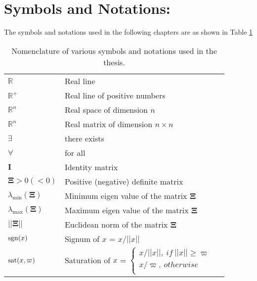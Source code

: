 \section{Symbols and Notations:}
The symbols and notations used in the following chapters are as shown in Table \ref{tab:notations}
\begin{table}[ht!]
    \centering
    \begin{tabular}{l l l}
        $\mathbb{R}$ & Real line  \\
        $\mathbb{R}^+$ & Real line of positive numbers \\
        $\mathbb{R}^n$ & Real space of dimension $n$ \\
        $\mathbb{R}^n$ & Real matrix of dimension $n \times n$ \\
        $\exists$ & there exists \\
        $\forall$ & for all \\
        $\mathbf{I}$ & Identity matrix \\ 
        $\mathbf{\Xi} > 0 (<0)$ & Positive (negative) definite matrix \\
        $\lambda_{\min}(\mathbf{\Xi})$  & Minimum eigen value of the matrix $\mathbf{\Xi}$ \\ 
        $\lambda_{\max}(\mathbf{\Xi})$  & Maximum eigen value of the matrix $\mathbf{\Xi}$ \\
        $||\mathbf{\Xi}||$ & Euclidean norm of the matrix $\mathbf{\Xi}$ \\
        $\operatorname{sgn}(x)$ & Signum of $x$ = $x/||x||$\\
        $\operatorname{sat}(x, \varpi)$ & Saturation of $x$ = 
        $\begin{cases}
            x/||x||, ~ if ~ ||x|| \geq \varpi \\
            x/ \varpi, ~ otherwise \\
        \end{cases}$
        
    \end{tabular}
    \caption{Nomenclature of various symbols and notations used in the thesis.}
    \label{tab:notations}
\end{table}